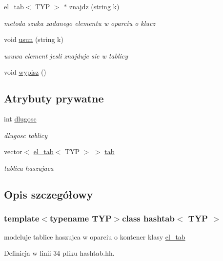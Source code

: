 \begin{DoxyCompactItemize}
\hyperlink{classel__tab}{el\-\_\-tab}$<$ \-T\-Y\-P $>$ $\ast$ \hyperlink{classhashtab_af6452a7dbb4a30870ec16635b859f18c}{znajdz} (string k)
\begin{DoxyCompactList}\small\item\em metoda szuka zadanego elementu w oparciu o klucz \end{DoxyCompactList}\item 
void \hyperlink{classhashtab_a2c0b494972d78d893a6db6c08b8af3a2}{usun} (string k)
\begin{DoxyCompactList}\small\item\em usuwa element jesli znajduje sie w tablicy \end{DoxyCompactList}\item 
void \hyperlink{classhashtab_a69b5dcc5943caf7afb74a98f461a1c1b}{wypisz} ()
\end{DoxyCompactItemize}
\subsection*{\-Atrybuty prywatne}
\begin{DoxyCompactItemize}
\item 
int \hyperlink{classhashtab_a1c0fe6f05d425274c58352e21cc7f496}{dlugosc}
\begin{DoxyCompactList}\small\item\em dlugosc tablicy \end{DoxyCompactList}\item 
vector$<$ \hyperlink{classel__tab}{el\-\_\-tab}$<$ \-T\-Y\-P $>$ $>$ \hyperlink{classhashtab_ab7d4d7c920e89fae8a292772dc9d7611}{tab}
\begin{DoxyCompactList}\small\item\em tablica haszujaca \end{DoxyCompactList}\end{DoxyCompactItemize}


\subsection{\-Opis szczegółowy}
\subsubsection*{template$<$typename \-T\-Y\-P$>$class hashtab$<$ T\-Y\-P $>$}

modeluje tablice haszujca w oparciu o kontener klasy \hyperlink{classel__tab}{el\-\_\-tab} 

\-Definicja w linii 34 pliku hashtab.\-hh.



